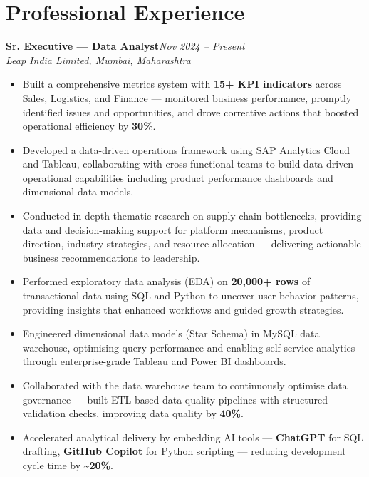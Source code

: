 \documentclass[10pt, letterpaper]{article}
\newcommand{\role}[3]{%
  \vspace{2pt}%
  {\bfseries #1}\hfill{\small\color{muted}\textit{#3}}\\[-2pt]%
  {\small\color{muted}\textit{#2}}%
}
\begin{document}
\section{Professional Experience}

\role{Sr. Executive — Data Analyst}{Leap India Limited, Mumbai, Maharashtra}{Nov 2024 – Present}

\begin{itemize}
  \item Built a comprehensive metrics system with \textbf{15+ KPI indicators} across Sales, Logistics, and Finance — monitored business performance, promptly identified issues and opportunities, and drove corrective actions that boosted operational efficiency by \textbf{30\%}.
  \item Developed a data-driven operations framework using SAP Analytics Cloud and Tableau, collaborating with cross-functional teams to build data-driven operational capabilities including product performance dashboards and dimensional data models.
  \item Conducted in-depth thematic research on supply chain bottlenecks, providing data and decision-making support for platform mechanisms, product direction, industry strategies, and resource allocation — delivering actionable business recommendations to leadership.
  \item Performed exploratory data analysis (EDA) on \textbf{20,000+ rows} of transactional data using SQL and Python to uncover user behavior patterns, providing insights that enhanced workflows and guided growth strategies.
  \item Engineered dimensional data models (Star Schema) in MySQL data warehouse, optimising query performance and enabling self-service analytics through enterprise-grade Tableau and Power BI dashboards.
  \item Collaborated with the data warehouse team to continuously optimise data governance — built ETL-based data quality pipelines with structured validation checks, improving data quality by \textbf{40\%}.
  \item Accelerated analytical delivery by embedding AI tools — \textbf{ChatGPT} for SQL drafting, \textbf{GitHub Copilot} for Python scripting — reducing development cycle time by \textbf{\textasciitilde20\%}.
\end{itemize}

\vspace{1pt}
\end{document}
